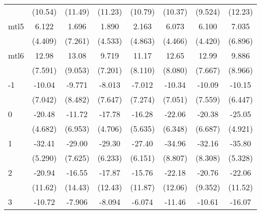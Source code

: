 \documentclass{article}
\begin{document}
{\begin{longtable}{l*{7}{c}}
                &  (10.54)         &  (11.49)         &  (11.23)         &  (10.79)         &  (10.37)         &  (9.524)         &  (12.23)         \\
mtl5            &    6.122         &    1.696         &    1.890         &    2.163         &    6.073         &    6.100         &    7.035         \\
                &  (4.409)         &  (7.261)         &  (4.533)         &  (4.863)         &  (4.466)         &  (4.420)         &  (6.896)         \\
mtl6            &    12.98         &    13.08         &    9.719         &    11.17         &    12.65         &    12.99         &    9.886         \\
                &  (7.591)         &  (9.053)         &  (7.201)         &  (8.110)         &  (8.080)         &  (7.667)         &  (8.966)         \\
-1              &   -10.04         &   -9.771         &   -8.013         &   -7.012         &   -10.34         &   -10.09         &   -10.15         \\
                &  (7.042)         &  (8.482)         &  (7.647)         &  (7.274)         &  (7.051)         &  (7.559)         &  (6.447)         \\
0               &   -20.48\sym{***}&   -11.72         &   -17.78\sym{***}&   -16.28\sym{**} &   -22.06\sym{**} &   -20.38\sym{**} &   -25.05\sym{***}\\
                &  (4.682)         &  (6.953)         &  (4.706)         &  (5.635)         &  (6.348)         &  (6.687)         &  (4.921)         \\
1               &   -32.41\sym{***}&   -29.00\sym{***}&   -29.30\sym{***}&   -27.40\sym{***}&   -34.96\sym{***}&   -32.16\sym{***}&   -35.80\sym{***}\\
                &  (5.290)         &  (7.625)         &  (6.233)         &  (6.151)         &  (8.807)         &  (8.308)         &  (5.328)         \\
2               &   -20.94         &   -16.55         &   -17.87         &   -15.76         &   -22.18         &   -20.76\sym{*}  &   -22.06         \\
                &  (11.62)         &  (14.43)         &  (12.43)         &  (11.87)         &  (12.06)         &  (9.352)         &  (11.52)         \\
3               &   -10.72         &   -7.906         &   -8.094         &   -6.074         &   -11.46         &   -10.61         &   -16.07\sym{*}  \\

\end{longtable}}
\end{document}
